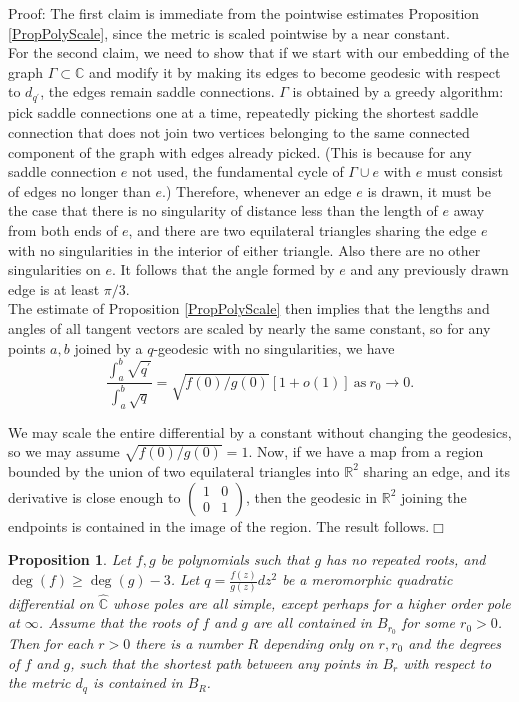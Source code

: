 \documentclass[12pt]{article}
\newtheorem{proposition}[theorem]{Proposition}
\newcommand{\rr}{\mathbb{R}}
\newcommand{\cc}{\mathbb{C}}
\begin{document}
\noindent Proof: The first claim is immediate from the pointwise estimates Proposition \ref{PropPolyScale}, since the metric is scaled pointwise by a near constant.\\

\noindent For the second claim, we need to show that if we start with our embedding of the graph $\Gamma \subset \cc$ and modify it by making its edges to become geodesic with respect to $d_{q^\prime}$, the edges remain saddle connections. $\Gamma$ is obtained by a greedy algorithm: pick saddle connections one at a time, repeatedly picking the shortest saddle connection that does not join two vertices belonging to the same connected component of the graph with edges already picked. (This is because for any saddle connection $e$ not used, the fundamental cycle of $\Gamma \cup e$ with $e$ must consist of edges no longer than $e$.) Therefore, whenever an edge $e$ is drawn, it must be the case that there is no singularity of distance less than the length of $e$ away from both ends of $e$, and there are two equilateral triangles sharing the edge $e$ with no singularities in the interior of either triangle. Also there are no other singularities on $e$. It follows that the angle formed by $e$ and any previously drawn edge is at least $\pi/3$.\\

\noindent The estimate of Proposition \ref{PropPolyScale} then implies that the lengths and angles of all tangent vectors are scaled by nearly the same constant, so for any points $a,b$ joined by a $q$-geodesic with no singularities, we have $$\frac{\int_a^b \sqrt{q^\prime}}{\int_a^b\sqrt{q}} = \sqrt{f(0)/g(0)}[1 + o(1)] ~ \mathrm{as} ~ r_0 \to 0.$$

\noindent We may scale the entire differential by a constant without changing the geodesics, so we may assume $\sqrt{f(0)/g(0)} = 1$. Now, if we have a map from a region bounded by the union of two equilateral triangles into $\rr^2$ sharing an edge, and its derivative is close enough to $\left( \begin{array}{rl} 1 & 0 \\ 0 & 1 \end{array} \right)$, then the geodesic in $\rr^2$ joining the endpoints is contained in the image of the region. The result follows.$\Box$

\begin{proposition}Let $f,g$ be polynomials such that $g$ has no repeated roots, and $\deg(f) \geq \deg(g) - 3$. Let $q =\frac{f(z)}{g(z)}dz^2$ be a meromorphic quadratic differential on $\hat{\cc}$ whose poles are all simple, except perhaps for a higher order pole at $\infty$. Assume that the roots of $f$ and $g$ are all contained in $B_{r_0}$ for some $r_0 > 0$. Then for each $r > 0$ there is a number $R$ depending only on $r, r_0$ and the degrees of $f$ and $g$, such that the shortest path between any points in $B_r$ with respect to the metric $d_q$ is contained in $B_R$.\end{proposition}
\end{document}
